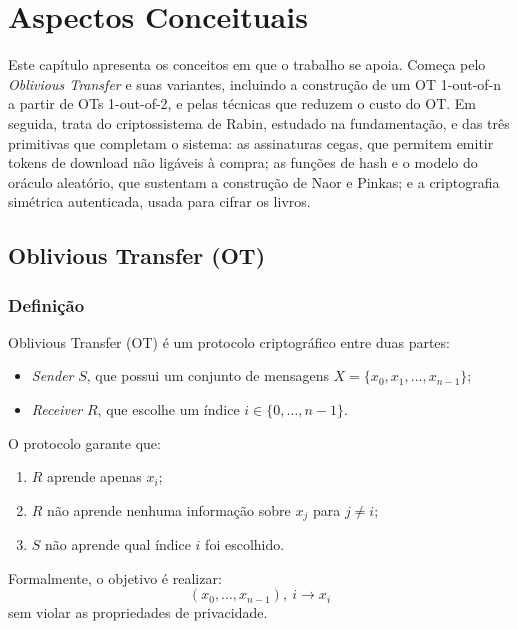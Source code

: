 \chapter{Aspectos Conceituais}\label{cap:conceitos}

Este capítulo apresenta os conceitos em que o trabalho se apoia. Começa pelo
\emph{Oblivious Transfer} e suas variantes, incluindo a construção de um OT
1-out-of-n a partir de OTs 1-out-of-2, e pelas técnicas que reduzem o custo do
OT. Em seguida, trata do criptossistema de Rabin, estudado na fundamentação, e
das três primitivas que completam o sistema: as assinaturas cegas, que
permitem emitir tokens de download não ligáveis à compra; as funções de hash
e o modelo do oráculo aleatório, que sustentam a construção de Naor e Pinkas;
e a criptografia simétrica autenticada, usada para cifrar os livros.


\section{Oblivious Transfer (OT)}

\subsection{Definição}

Oblivious Transfer (OT) é um protocolo criptográfico entre duas partes:

\begin{itemize}
\item \emph{Sender} $S$, que possui um conjunto de mensagens
$X = \{x_0, x_1, \ldots, x_{n-1}\}$;
\item \emph{Receiver} $R$, que escolhe um índice $i \in \{0, \ldots, n-1\}$.
\end{itemize}

O protocolo garante que:

\begin{enumerate}
\item $R$ aprende apenas $x_i$;
\item $R$ não aprende nenhuma informação sobre $x_j$ para $j \neq i$;
\item $S$ não aprende qual índice $i$ foi escolhido.
\end{enumerate}

Formalmente, o objetivo é realizar:
\[
(x_0, \ldots, x_{n-1}),\ i \longrightarrow x_i
\]
sem violar as propriedades de privacidade.

